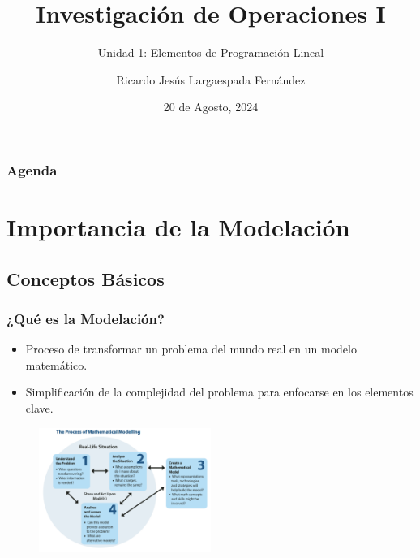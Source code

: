 \documentclass{beamer}
\title{Investigación de Operaciones I}
\subtitle{Unidad 1: Elementos de Programación Lineal}
\author{Ricardo Jesús Largaespada Fernández}
\institute{Ingeniería de Sistemas, DACTIC, UNI}
\date{20 de Agosto, 2024}
\begin{document}
\frame{\titlepage}

\begin{frame}
\frametitle{Agenda}
\tableofcontents
\end{frame}

\section{Importancia de la Modelación}
\subsection{Conceptos Básicos}
\begin{frame}
    \frametitle{¿Qué es la Modelación?}
    \begin{itemize}
        \item Proceso de transformar un problema del mundo real en un modelo matemático.
        \item Simplificación de la complejidad del problema para enfocarse en los elementos clave.
    \end{itemize}
    \begin{figure}
        \centering
        \includegraphics[width=0.5\textwidth]{images/mathematical_modelling.png} %
    \end{figure}
\end{frame}
\end{document}
